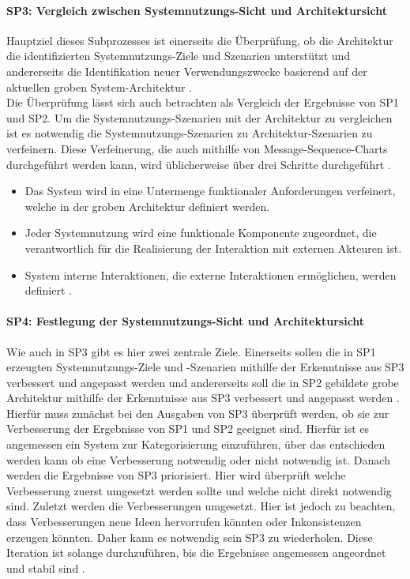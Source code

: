 \paragraph{SP3: Vergleich zwischen Systemnutzungs-Sicht und Architektursicht}
Hauptziel dieses Subprozesses ist einerseits die Überprüfung, ob die Architektur die identifizierten Systemnutzungs-Ziele und Szenarien unterstützt und andererseits die Identifikation neuer Verwendungszwecke basierend auf der aktuellen groben System-Architektur \cite{Poh01}.\\

Die Überprüfung lässt sich auch betrachten als Vergleich der Ergebnisse von SP1 und SP2. Um die Systemnutzungs-Szenarien mit der Architektur zu vergleichen ist es notwendig die Systemnutzungs-Szenarien zu Architektur-Szenarien zu verfeinern. Diese Verfeinerung, die auch mithilfe von Message-Sequence-Charts durchgeführt werden kann, wird üblicherweise über drei Schritte durchgeführt \cite{Poh01}.\\

\begin{itemize}
\item Das System wird in eine Untermenge funktionaler Anforderungen verfeinert, welche in der groben Architektur definiert werden.
\item Jeder Systemnutzung wird eine funktionale Komponente zugeordnet, die verantwortlich für die Realisierung der Interaktion mit externen Akteuren ist. 
\item System interne Interaktionen, die externe Interaktionen ermöglichen, werden definiert \cite{Poh01}.\\
\end{itemize}

\paragraph{SP4: Festlegung der Systemnutzungs-Sicht und Architektursicht}
Wie auch in SP3 gibt es hier zwei zentrale Ziele. Einerseits sollen die in SP1 erzeugten Systemnutzungs-Ziele und -Szenarien mithilfe der Erkenntnisse aus SP3 verbessert und angepasst werden und andererseits soll die in SP2 gebildete grobe Architektur mithilfe der Erkenntnisse aus SP3 verbessert und angepasst werden \cite{Poh01}.\\

Hierfür muss zunächst bei den Ausgaben von SP3 überprüft werden, ob sie zur Verbesserung der Ergebnisse von SP1 und SP2 geeignet sind. Hierfür ist es angemessen ein System zur Kategorisierung einzuführen, über das entschieden werden kann ob eine Verbesserung notwendig oder nicht notwendig ist. Danach werden die Ergebnisse von SP3 priorisiert. Hier wird überprüft welche Verbesserung zuerst umgesetzt werden sollte und welche nicht direkt notwendig sind. Zuletzt werden die Verbesserungen umgesetzt. Hier ist jedoch zu beachten, dass Verbesserungen neue Ideen hervorrufen könnten oder Inkonsistenzen erzeugen könnten. Daher kann es notwendig sein SP3 zu wiederholen. Diese Iteration ist solange durchzuführen, bis die Ergebnisse angemessen angeordnet und stabil sind \cite{Poh01}.\\

